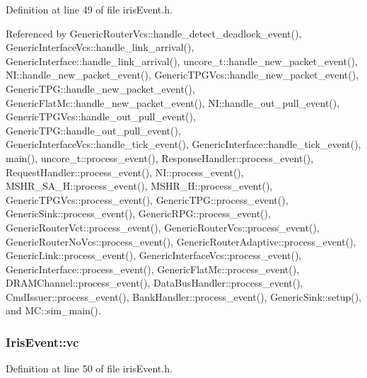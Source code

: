 Definition at line 49 of file irisEvent.h.

Referenced by GenericRouterVcs::handle\_\-detect\_\-deadlock\_\-event(), GenericInterfaceVcs::handle\_\-link\_\-arrival(), GenericInterface::handle\_\-link\_\-arrival(), uncore\_\-t::handle\_\-new\_\-packet\_\-event(), NI::handle\_\-new\_\-packet\_\-event(), GenericTPGVcs::handle\_\-new\_\-packet\_\-event(), GenericTPG::handle\_\-new\_\-packet\_\-event(), GenericFlatMc::handle\_\-new\_\-packet\_\-event(), NI::handle\_\-out\_\-pull\_\-event(), GenericTPGVcs::handle\_\-out\_\-pull\_\-event(), GenericTPG::handle\_\-out\_\-pull\_\-event(), GenericInterfaceVcs::handle\_\-tick\_\-event(), GenericInterface::handle\_\-tick\_\-event(), main(), uncore\_\-t::process\_\-event(), ResponseHandler::process\_\-event(), RequestHandler::process\_\-event(), NI::process\_\-event(), MSHR\_\-SA\_\-H::process\_\-event(), MSHR\_\-H::process\_\-event(), GenericTPGVcs::process\_\-event(), GenericTPG::process\_\-event(), GenericSink::process\_\-event(), GenericRPG::process\_\-event(), GenericRouterVct::process\_\-event(), GenericRouterVcs::process\_\-event(), GenericRouterNoVcs::process\_\-event(), GenericRouterAdaptive::process\_\-event(), GenericLink::process\_\-event(), GenericInterfaceVcs::process\_\-event(), GenericInterface::process\_\-event(), GenericFlatMc::process\_\-event(), DRAMChannel::process\_\-event(), DataBusHandler::process\_\-event(), CmdIssuer::process\_\-event(), BankHandler::process\_\-event(), GenericSink::setup(), and MC::sim\_\-main().
\subsubsection[{vc}]{ {\bf IrisEvent::vc}}\label{classIrisEvent_86ee921447bbc46175221fd912f6e0a7}




Definition at line 50 of file irisEvent.h.


